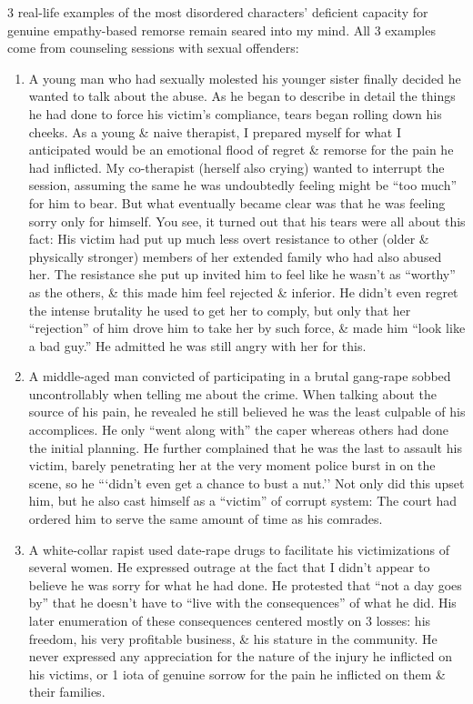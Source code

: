 \documentclass{article}
\numberwithin{equation}{section}
\begin{document}
\begin{itemize}
	3 real-life examples of the most disordered characters' deficient capacity for genuine empathy-based remorse remain seared into my mind. All 3 examples come from counseling sessions with sexual offenders:
	\begin{enumerate}
		\item A young man who had sexually molested his younger sister finally decided he wanted to talk about the abuse. As he began to describe in detail the things he had done to force his victim's compliance, tears began rolling down his cheeks. As a young \& naive therapist, I prepared myself for what I anticipated would be an emotional flood of regret \& remorse for the pain he had inflicted. My co-therapist (herself also crying) wanted to interrupt the session, assuming the same he was undoubtedly feeling might be ``too much'' for him to bear. But what eventually became clear was that he was feeling sorry only for himself. You see, it turned out that his tears were all about this fact: His victim had put up much less overt resistance to other (older \& physically stronger) members of her extended family who had also abused her. The resistance she put up invited him to feel like he wasn't as ``worthy'' as the others, \& this made him feel rejected \& inferior. He didn't even regret the intense brutality he used to get her to comply, but only that her ``rejection'' of him drove him to take her by such force, \& made him ``look like a bad guy.'' He admitted he was still angry with her for this.
		\item A middle-aged man convicted of participating in a brutal gang-rape sobbed uncontrollably when telling me about the crime. When talking about the source of his pain, he revealed he still believed he was the least culpable of his accomplices. He only ``went along with'' the caper whereas others had done the initial planning. He further complained that he was the last to assault his victim, barely penetrating her at the very moment police burst in on the scene, so he ```didn't even get a chance to bust a nut.'' Not only did this upset him, but he also cast himself as a ``victim'' of corrupt system: The court had ordered him to serve the same amount of time as his comrades.
		\item A white-collar rapist used date-rape drugs to facilitate his victimizations of several women. He expressed outrage at the fact that I didn't appear to believe he was sorry for what he had done. He protested that ``not a day goes by'' that he doesn't have to ``live with the consequences'' of what he did. His later enumeration of these consequences centered mostly on 3 losses: his freedom, his very profitable business, \& his stature in the community. He never expressed any appreciation for the nature of the injury he inflicted on his victims, or 1 iota of genuine sorrow for the pain he inflicted on them \& their families.

\end{enumerate}
\end{itemize}
\end{document}
